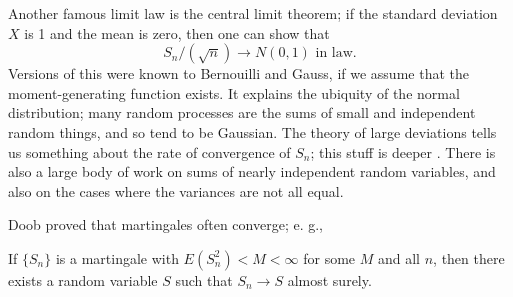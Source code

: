 Another famous limit law is the central limit theorem; if the standard
deviation $X$ is 1 and the mean is zero, then one can show that
\[S_n/(\surd n)\rightarrow N(0,1)\mbox{ in law}.\]
Versions of this were known to Bernouilli and Gauss, if we assume that the
moment-generating function exists. It explains the ubiquity of the normal
distribution; many random processes are the sums of small and independent
random things, and so tend to be Gaussian.
The theory of large deviations tells us something about the rate of
convergence of $S_n$; this stuff is deeper \cite{Varadhan,Donsker,Lewis,Stroock2}.
There is also a large body of work on sums of nearly independent random
variables, and also on the cases where the variances are not all equal.

Doob proved that martingales often converge; e. g.,
\begin{theorem}
If $\{S_n\}$ is a martingale with $E(S_n^2)<M<\infty$ for some $M$ and all
$n$, then there exists a random variable $S$ such that $S_n\rightarrow S$
almost surely.
\end{theorem}

